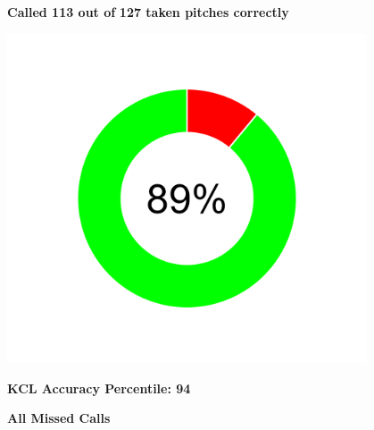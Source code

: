 \documentclass[
]{article}
\begin{document}
\begin{center}
\begin{minipage}[t][3.5in][t]{\textwidth}
\begin{minipage}[t]{0.25\textwidth}
\centering
\vspace*{-5em}
\textbf{Called 113 out of}
\textbf{127 taken pitches correctly}
\end{minipage}
\hfill
\begin{minipage}[t]{0.28\textwidth}
\centering
\includegraphics[width=0.8\textwidth]{plots/overall_accuracy.png}
\end{minipage}
\hfill
\begin{minipage}[t]{0.25\textwidth}
\centering
\vspace*{-4em}
\textbf{KCL Accuracy Percentile: 94}
\end{minipage}
\end{minipage}
\end{center}

\vspace*{-15em}

\begin{center}
\Large \textbf{All Missed Calls}
\end{center}
\end{document}

